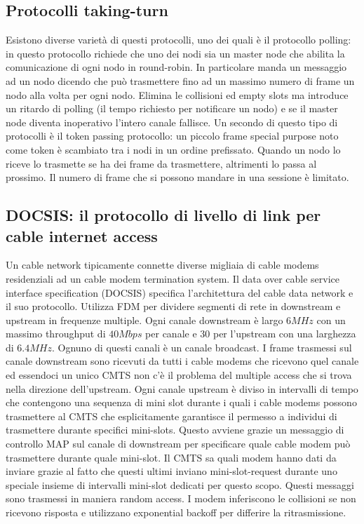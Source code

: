 \subsection{Protocolli taking-turn}
Esistono diverse variet\`a di questi protocolli, uno dei quali \`e il protocollo polling: in questo protocollo richiede che uno dei nodi sia un master node che abilita la comunicazione di ogni nodo in round-robin. In particolare manda un 
messaggio ad un nodo dicendo che pu\`o trasmettere fino ad un massimo numero di frame un nodo alla volta per ogni nodo. Elimina le collisioni ed empty slots ma introduce un ritardo di polling (il tempo
richiesto per notificare un nodo) e se il master node diventa inoperativo l'intero canale fallisce. Un secondo di questo tipo di protocolli \`e il token passing protocollo: un piccolo frame special purpose noto come
token \`e scambiato tra i nodi in un ordine prefissato. Quando un nodo lo riceve lo trasmette se ha dei frame da trasmettere, altrimenti lo passa al prossimo. Il numero di frame che si possono mandare in una 
sessione \`e limitato. 
\subsection{DOCSIS: il protocollo di livello di link per cable internet access}
Un cable network tipicamente connette diverse migliaia di cable modems residenziali ad un cable modem termination system. Il data over cable service interface specification (DOCSIS) specifica l'architettura
del cable data network e il suo protocollo. Utilizza FDM per dividere segmenti di rete  in downstream e upstream in frequenze multiple. Ogni canale downstream \`e largo $6MHz$ con un massimo throughput 
di $40Mbps$ per canale e $30$ per l'upstream con una larghezza di $6.4MHz$.  Ognuno di questi canali \`e un canale broadcast.  I frame trasmessi sul canale downstream sono ricevuti da tutti i cable modems
che ricevono quel canale ed essendoci un unico CMTS non c'\`e il problema del multiple access che si trova nella direzione dell'upstream. Ogni canale upstream \`e diviso in intervalli di tempo che contengono 
una sequenza di mini slot durante i quali i cable modems possono trasmettere al CMTS che esplicitamente garantisce il permesso a individui di trasmettere durante specifici mini-slots. Questo avviene grazie un 
messaggio di controllo MAP sul canale di downstream per specificare quale cable modem pu\`o trasmettere durante quale mini-slot. Il CMTS sa quali modem hanno dati da inviare grazie al fatto che questi 
ultimi inviano mini-slot-request durante uno speciale insieme di intervalli mini-slot dedicati per questo scopo. Questi messaggi sono trasmessi in maniera random access. I modem inferiscono le collisioni se 
non ricevono risposta e utilizzano exponential backoff per differire la ritrasmissione. 
